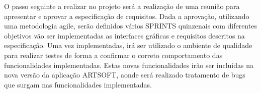 \documentclass[sigplan]{acmart}
\begin{document}
O passo seguinte a realizar no projeto será a realização de uma reunião para apresentar e aprovar a especificação de requisitos. Dada a aprovação, utilizando uma metodologia agile, serão definidos vários SPRINTS quinzenais com diferentes objetivos vão ser implementadas as interfaces gráficas e requisitos descritos na especificação. Uma vez implementadas, irá ser utilizado o ambiente de qualidade para realizar testes de forma a confirmar o correto comportamento das funcionalidades implementadas. Estas novas funcionalidades irão ser incluídas na nova versão da aplicação ARTSOFT, aonde será realizado tratamento de bugs que surgam nas funcionalidades implementadas.



\end{document}
